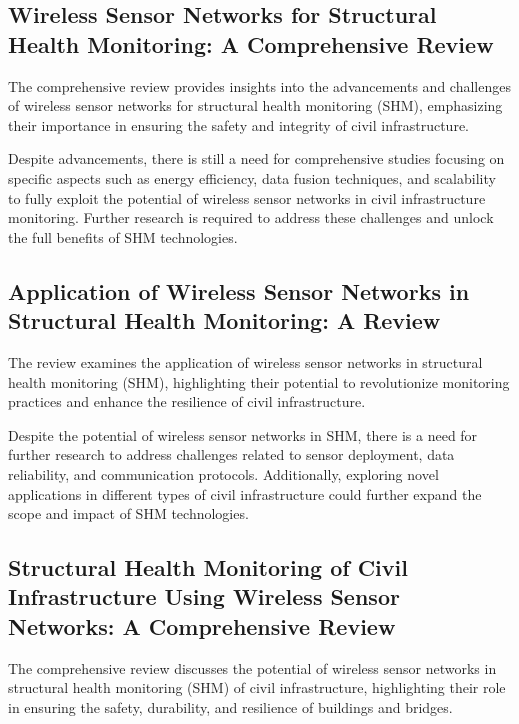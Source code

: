 \documentclass[journal, a4paper]{IEEEtran}
\begin{document}
\subsection{Wireless Sensor Networks for Structural Health Monitoring: A Comprehensive Review}
The comprehensive review provides insights into the advancements and challenges of wireless sensor networks for structural health monitoring (SHM), emphasizing their importance in ensuring the safety and integrity of civil infrastructure. 

\begin{description}[style=standard, font=\normalfont]
  \item[Research gap:] Despite advancements, there is still a need for comprehensive studies focusing on specific aspects such as energy efficiency, data fusion techniques, and scalability to fully exploit the potential of wireless sensor networks in civil infrastructure monitoring. Further research is required to address these challenges and unlock the full benefits of SHM technologies.
\end{description}

 
\subsection{Application of Wireless Sensor Networks in Structural Health Monitoring: A Review}
The review examines the application of wireless sensor networks in structural health monitoring (SHM), highlighting their potential to revolutionize monitoring practices and enhance the resilience of civil infrastructure. 

\begin{description}[style=standard, font=\normalfont]
  \item[Research gap:] Despite the potential of wireless sensor networks in SHM, there is a need for further research to address challenges related to sensor deployment, data reliability, and communication protocols. Additionally, exploring novel applications in different types of civil infrastructure could further expand the scope and impact of SHM technologies.
\end{description}


\subsection{Structural Health Monitoring of Civil Infrastructure Using Wireless Sensor Networks: A Comprehensive Review}
The comprehensive review discusses the potential of wireless sensor networks in structural health monitoring (SHM) of civil infrastructure, highlighting their role in ensuring the safety, durability, and resilience of buildings and bridges. 
\end{document}

